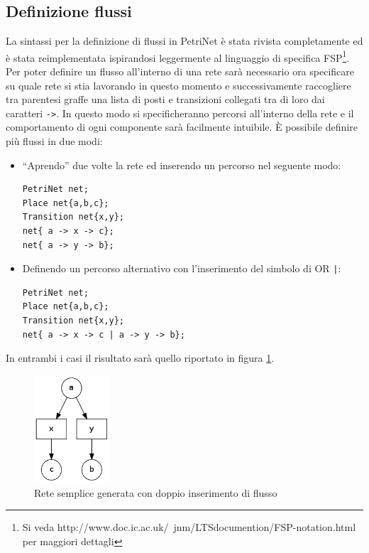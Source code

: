 \documentclass[italian,12pt]{book}
\begin{document}
\subsection{Definizione flussi}\label{ssect:nuovi_archi}
La sintassi per la definizione di flussi in PetriNet è stata rivista completamente ed è stata 
reimplementata ispirandosi leggermente al linguaggio di specifica FSP\footnote{ Si veda 
http://www.doc.ic.ac.uk/~jnm/LTSdocumention/FSP-notation.html per maggiori dettagli}.\\
Per poter definire un flusso all'interno di una rete sarà necessario ora specificare su quale rete si stia 
lavorando in questo momento e successivamente raccogliere tra parentesi graffe una lista di posti e transizioni
collegati tra di loro dai caratteri {\tt ->}. In questo modo si specificheranno percorsi all'interno della 
rete e il comportamento di ogni componente sarà facilmente intuibile.
È possibile definire più flussi in due modi:
\begin{itemize}

\item ``Aprendo'' due volte la rete ed inserendo un percorso nel seguente modo:
\begin{verbatim}PetriNet net;
Place net{a,b,c};
Transition net{x,y};
net{ a -> x -> c};
net{ a -> y -> b};
\end{verbatim}

\item Definendo un percorso alternativo con l'inserimento del simbolo di OR {\tt |}:
\begin{verbatim}PetriNet net;
Place net{a,b,c};
Transition net{x,y};
net{ a -> x -> c | a -> y -> b};
\end{verbatim}
\end{itemize}

In entrambi i casi il risultato sarà quello riportato in figura \ref{fig:flussi1.png}.
\begin{figure}[htb]
\centerline{\includegraphics[height=4cm]{img/flussi1.png}}
\caption{Rete semplice generata con doppio inserimento di flusso}\label{fig:flussi1.png}
\end{figure}
\end{document}
